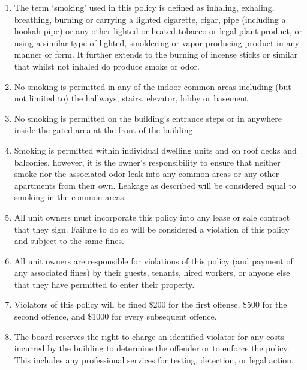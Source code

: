 \begin{enumerate}

\item The term ‘smoking’ used in this policy is defined as inhaling, exhaling, breathing, burning or carrying a lighted cigarette, cigar, pipe (including a hookah pipe) or any other lighted or heated tobacco or legal plant product, or using a similar type of lighted, smoldering or vapor-producing product in any manner or form.  It further extends to the burning of incense sticks or similar that whilst not inhaled do produce smoke or odor.

\item No smoking is permitted in any of the indoor common areas including (but not limited to) the hallways, stairs, elevator, lobby or basement. 

\item No smoking is permitted on the building’s entrance steps or in anywhere inside the gated area at the front of the building.

\item Smoking is permitted within individual dwelling units and on roof decks and balconies, however, it is the owner’s responsibility to ensure that neither smoke nor the associated odor leak into any common areas or any other apartments from their own.  Leakage as described will be considered equal to smoking in the common areas. 

\item All unit owners must incorporate this policy into any lease or sale contract that they sign.  Failure to do so will be considered a violation of this policy and subject to the same fines.

\item All unit owners are responsible for violations of this policy (and payment of any associated fines) by their guests, tenants, hired workers, or anyone else that they have permitted to enter their property.  

\item Violators of this policy will be fined \$200 for the first offense, \$500 for the second offence, and \$1000 for every subsequent offence.

\item The board reserves the right to charge an identified violator for any costs incurred by the building to determine the offender or to enforce the policy.  This includes any professional services for testing, detection, or legal action.

\end{enumerate}



